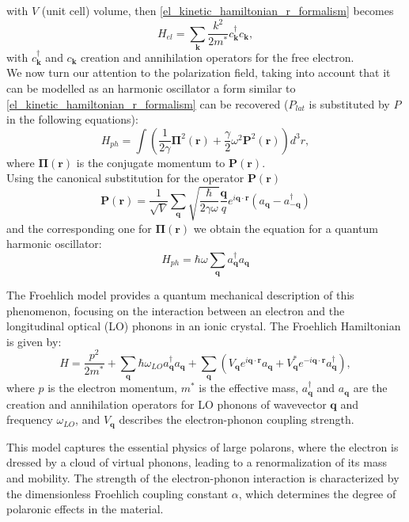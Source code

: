 \documentclass[12pt, a4paper]{report}
\numberwithin{equation}{section}
\begin{document}
with $V$ (unit cell) volume, then \ref{el_kinetic_hamiltonian_r_formalism} becomes
\begin{equation}
    H_{el}=\sum_\mathbf{k}\frac{k^2}{2m^*}c^\dagger_\mathbf{k}c_\mathbf{k},
    \label{el_kinetic_hamiltonian_k_formalism}
\end{equation}
with $c^\dagger_\mathbf{k}$ and $c_\mathbf{k}$ creation and annihilation operators for the free electron.\\
We now turn our attention to the polarization field, taking into account that it can be modelled as an harmonic oscillator a 
form similar to \ref{el_kinetic_hamiltonian_r_formalism} can be recovered ($P_{lat}$ is substituted by $P$ in the following equations):
\begin{equation}
    H_{ph}=\int\left(\frac{1}{2\gamma}\mathbf{\Pi}^2(\mathbf{r})+\frac{\gamma}{2}\omega^2\mathbf{P}^2(\mathbf{r})\right)d^3r,
\end{equation}
where $\mathbf{\Pi}(\mathbf{r})$ is the conjugate momentum to $\mathbf{P}(\mathbf{r})$.\\
Using the canonical substitution for the operator $\mathbf{P}(\mathbf{r})$ 
\begin{equation}
    \mathbf{P}(\mathbf{r})=\frac{1}{\sqrt{V}}\sum_{\mathbf{q}}\sqrt{\frac{\hbar}{2\gamma\omega}}\frac{\mathbf{q}}{q}e^{i\mathbf{q}\cdot\mathbf{r}}(a_\mathbf{q}-a_\mathbf{-q}^\dagger)
\end{equation}
and the corresponding one for $\mathbf{\Pi}(\mathbf{r})$ we obtain the equation for a quantum harmonic oscillator:
\begin{equation}
    H_{ph}=\hbar\omega\sum_\mathbf{q} a^\dagger_\mathbf{q}a_\mathbf{q}
\end{equation}

The Froehlich model provides a quantum mechanical description of this phenomenon, focusing on the interaction between an electron 
and the longitudinal optical (LO) phonons in an ionic crystal. The Froehlich Hamiltonian is given by:
\begin{equation}
    H = \frac{p^2}{2m^*} + \sum_{\mathbf{q}} \hbar \omega_{LO} a^\dagger_{\mathbf{q}} a_{\mathbf{q}} + \sum_{\mathbf{q}} \left( V_{\mathbf{q}} e^{i\mathbf{q}\cdot\mathbf{r}} a_{\mathbf{q}} + V^*_{\mathbf{q}} e^{-i\mathbf{q}\cdot\mathbf{r}} a^\dagger_{\mathbf{q}} \right),
\end{equation}
where $p$ is the electron momentum, $m^*$ is the effective mass, $a^\dagger_{\mathbf{q}}$ and $a_{\mathbf{q}}$ are the creation and annihilation operators for LO phonons of wavevector $\mathbf{q}$ and frequency $\omega_{LO}$, and $V_{\mathbf{q}}$ describes the electron-phonon coupling strength.

This model captures the essential physics of large polarons, where the electron is dressed by a cloud of virtual phonons, leading to a renormalization of its mass and mobility. The strength of the electron-phonon interaction is characterized by the dimensionless Froehlich coupling constant $\alpha$, which determines the degree of polaronic effects in the material.
\printbibliography
\end{document}
